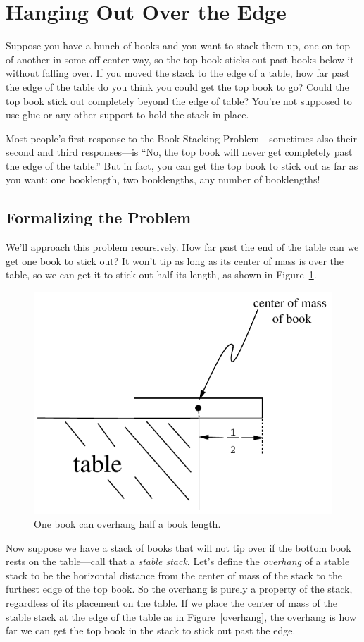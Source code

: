 \section{Hanging Out Over the Edge}\label{book_stacking_sec}
Suppose you have a bunch of books and you want to stack them up, one
on top of another in some off-center way, so the top book sticks out
past books below it without falling over.  If you moved the stack to
the edge of a table, how far past the edge of the table do you think
you could get the top book to go?  Could the top book stick out
completely beyond the edge of table?  You're not supposed to use glue
or any other support to hold the stack in place.

Most people's first response to the Book Stacking Problem---sometimes also their
second and third responses---is ``No, the top book will never get
completely past the edge of the table.''  But in fact, you can get the
top book to stick out as far as you want: one booklength, two
booklengths, any number of booklengths!

\subsection{Formalizing the Problem}

We'll approach this problem recursively.  How far past the end of the
table can we get one book to stick out?  It won't tip as long as its
center of mass is over the table, so we can get it to stick out half its
length, as shown in Figure~\ref{one-stable-book}.

\begin{figure}[htbp]
\centerline{\includegraphics[width=.60\textwidth]{figures/drafts/bookstack-3}}
\caption{One book can overhang half a book length.}
\label{one-stable-book}
\end{figure}

Now suppose we have a stack of books that will not tip over if the
bottom book rests on the table---call that a \emph{stable stack}.
Let's define the \emph{overhang} of a stable stack to be the
horizontal distance from the center of mass of the stack to the
furthest edge of the top book.  So the overhang is purely a property
of the stack, regardless of its placement on the table.  If we place
the center of mass of the stable stack at the edge of the table as in
Figure~\ref{overhang}, the overhang is how far we can get the top book
in the stack to stick out past the edge.

